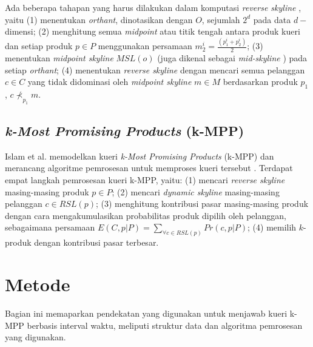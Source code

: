 \documentclass[conference]{IEEEtran}
\begin{document}
Ada beberapa tahapan yang harus dilakukan dalam komputasi \textit{reverse skyline} \cite{kmpp}, yaitu (1) menentukan \textit{orthant}, dinotasikan dengan $O$, sejumlah $2^d$ pada data $d-$dimensi; (2) menghitung semua \textit{midpoint} atau titik tengah antara produk kueri dan setiap produk $p \in P$ menggunakan persamaan $m_2^i = \frac{(p_1^i + p_2^i)}{2}$; (3) menentukan \textit{midpoint skyline} $MSL(o)$ (juga dikenal sebagai \textit{mid-skyline} \cite{mid-skyline}) pada setiap \textit{orthant}; (4) menentukan \textit{reverse skyline} dengan mencari semua pelanggan $c \in C$ yang tidak didominasi oleh \textit{midpoint skyline} $m \in M$ berdasarkan produk $p_1$, $c \nprec_{p_1} m$.

\subsection{\textit{k-Most Promising Products} (k-MPP)}
Islam et al. memodelkan kueri \textit{k-Most Promising Products} (k-MPP) dan merancang algoritme pemrosesan untuk memproses kueri tersebut \cite{kmpp}. Terdapat empat langkah pemrosesan kueri k-MPP, yaitu: (1) mencari \textit{reverse skyline} masing-masing produk  $p \in P$; (2) mencari \textit{dynamic skyline} masing-masing pelanggan $c \in RSL(p)$; (3) menghitung kontribusi pasar masing-masing produk dengan cara mengakumulasikan probabilitas produk dipilih oleh pelanggan, sebagaimana persamaan $E(C, p|P) = \sum_{\forall c \in RSL(p)} Pr(c, p|P)$; (4) memilih $k$-produk dengan kontribusi pasar terbesar.

\section{Metode}
Bagian ini memaparkan pendekatan yang digunakan untuk menjawab kueri k-MPP berbasis interval waktu, meliputi struktur data dan algoritma pemrosesan yang digunakan.
\end{document}

